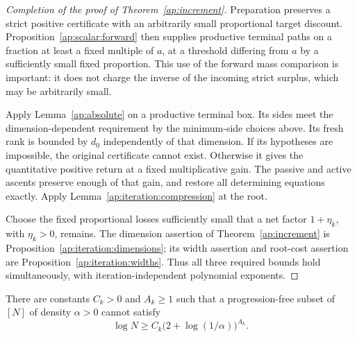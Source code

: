 \begin{proof}[Completion of the proof of Theorem~\ref{ap:increment}]
Preparation preserves a strict positive certificate with an arbitrarily
small proportional target discount.  Proposition~\ref{ap:scalar:forward}
then supplies productive terminal paths on a
fraction at least a fixed multiple of $a$, at a threshold differing
from $a$ by a sufficiently small fixed proportion.  This use of the
forward mass comparison is important: it does not charge the inverse
of the incoming strict surplus, which may be arbitrarily small.

Apply Lemma~\ref{ap:absolute} on a productive terminal box.  Its sides meet
the dimension-dependent requirement by the minimum-side choices above.
Its fresh rank is bounded by $d_0$ independently of that dimension.
If its hypotheses are impossible, the original certificate cannot
exist.  Otherwise it gives the quantitative positive return at a fixed
multiplicative gain.  The passive and active ascents preserve enough
of that gain, and restore all determining equations exactly.  Apply
Lemma~\ref{ap:iteration:compression} at the root.

Choose the fixed proportional losses sufficiently small that a net
factor $1+\eta_k$, with $\eta_k>0$, remains.  The dimension assertion of
Theorem~\ref{ap:increment} is
Proposition~\ref{ap:iteration:dimensions}; its width assertion and
root-cost assertion are Proposition~\ref{ap:iteration:widths}.
Thus all three required bounds hold simultaneously, with
iteration-independent polynomial exponents.
\end{proof}

\begin{proposition}
\label{ap:iteration:closure}
There are constants $C_k>0$ and $A_k\ge1$ such that a progression-free subset of
$[N]$ of density $\alpha>0$ cannot satisfy
\[
                 \log N\ge C_k\bigl(2+\log(1/\alpha)\bigr)^{A_k}.
\]
\end{proposition}

